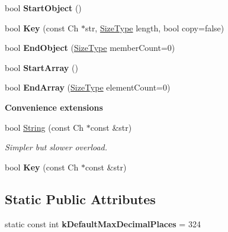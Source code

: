 \begin{Indent}
\begin{DoxyCompactItemize}
bool {\bfseries Start\+Object} ()
\item 
\mbox{\label{a02224_a19096d2ccb90761f63ab1240337bf90a}} 
bool {\bfseries Key} (const Ch $\ast$str, \hyperlink{a00560_a5ed6e6e67250fadbd041127e6386dcb5}{Size\+Type} length, bool copy=false)
\item 
\mbox{\label{a02224_a0771a565261564c27676b7300b11f2b5}} 
bool {\bfseries End\+Object} (\hyperlink{a00560_a5ed6e6e67250fadbd041127e6386dcb5}{Size\+Type} member\+Count=0)
\item 
\mbox{\label{a02224_a38715785194b42cd67ba5dd52bf7967e}} 
bool {\bfseries Start\+Array} ()
\item 
\mbox{\label{a02224_ac88d533095591a878500b63b351d4013}} 
bool {\bfseries End\+Array} (\hyperlink{a00560_a5ed6e6e67250fadbd041127e6386dcb5}{Size\+Type} element\+Count=0)
\end{DoxyCompactItemize}
\end{Indent}
\begin{Indent}\textbf{ Convenience extensions}\par
\begin{DoxyCompactItemize}
\item 
\mbox{\label{a02224_a2a2c6f51644b2013471aec4dac0d7466}} 
bool \hyperlink{a02224_a2a2c6f51644b2013471aec4dac0d7466}{String} (const Ch $\ast$const \&str)
\begin{DoxyCompactList}\small\item\em Simpler but slower overload. \end{DoxyCompactList}\item 
\mbox{\label{a02224_ab6057b7fa9737edb4da55a7afefa966d}} 
bool {\bfseries Key} (const Ch $\ast$const \&str)
\end{DoxyCompactItemize}
\end{Indent}
\subsection*{Static Public Attributes}
\begin{DoxyCompactItemize}
\item 
\mbox{\label{a02224_ab46d66ae0ca78cb03ab7fb865d129934}} 
static const int {\bfseries k\+Default\+Max\+Decimal\+Places} = 324
\end{DoxyCompactItemize}
